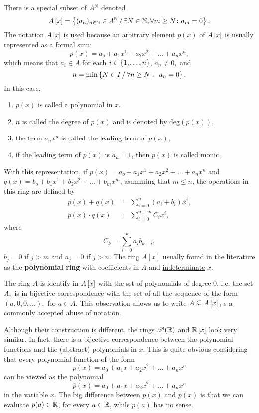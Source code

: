 \documentclass[11pt,a4paper]{article}
\begin{document}
\begin{exa}[Important]
    There is a special subset of $A^{\mathbb{N}}$ denoted
\[
A\left[x\right]=\left\lbrace (a_n)_{n\in \mathbb{N}} \in A^{\mathbb{N}} \,/\, \exists N\in \mathbb{N},\forall m\geq N\colon a_m=0 \right\rbrace,
\]
The notation  $A\left[x\right]$ is used because an arbitrary element $p(x)$ of $A\left[x\right]$ is usually represented as a \underline{formal sum}:
\[p(x)=a_o+a_1x^1+a_2x^2+
	\ldots+a_nx^n,\]
which means that $a_i\in A$ for each $i\in\left\lbrace 1,\ldots,n \right\rbrace$, $ a_n\neq 0,$ and 
\[
    n=\min\left\lbrace N\in I \, / \: \forall n\geq N:\: \: a_n = 0 \right\rbrace. 
\]
In this case,
\begin{enumerate}
    \item $p(x)$ is called a \underline{polynomial} in $x$.
    \item $n$ is called the degree of $p(x)$ and is denoted by $\text{deg}(p(x))$, 
    \item the term $a_nx^n$ is called the \underline{leading} term of $p(x)$,
    \item if the leading term of $p(x)$ is $a_n=1$, then $p(x)$ is called \underline{monic.} 
\end{enumerate} 

With this representation, if $p(x)=a_o+a_1x^1+a_2x^2+
	\ldots+a_nx^n$ and $q(x)=b_o+b_1x^1+b_2x^2+
	\ldots+b_mx^m$, asumming that $m\leq n$, the operations in this ring are defined by
\begin{align*}
    p(x)+q(x)&=\sum_{i=0}^{n} (a_i+b_i)x^i,\\
    p(x)\cdot q(x)&= \sum_{i=0}^{n+m} C_i x^i,
\end{align*}
where \[C_k=\sum_{i=0}^{k} a_ib_{k-i},\] $b_j=0$ if $j> m$ and $a_j=0$ if $j>n$. The ring $A[x]$ usually found in the literature as the \textbf{polynomial ring} with coefficients in $A$ and \underline{indeterminate} $x$. 
\end{exa}

\begin{rem}
    The ring $A$ is identify in $A\left[x\right]$ with the set of polynomials of degree 0, i.e, the set $A,$ is in bijective correspondence with the set of all the sequence of the form
    \((a,0,0,\ldots),\)
    for $a\in A.$ This observation allows us to write $A\subseteq A\left[x\right],$ s a commonly accepted abuse of notation. 
\end{rem}

\begin{rem}
    Although their construction is different, the rings $\mathscr{P}(\mathbb{R})$ and $\mathbb{R}\left[x\right]$ look very similar. In fact, there is a bijective correspondence between the polynomial functions and the (abstract) polynomials in $x$. 
    This is quite obvious considering that every polynomial function of the form 
    \[p(x)=a_0+a_1x+a_2x^2+\ldots + a_n x^n\]
    can be viewed as the polynomial 
    \[\overline{p}(x)=a_0+a_1x+a_2x^2+\ldots + a_n x^n\]
    in the variable $x$. The big difference between $p(x)$ and $\overline{p}(x)$ is that we can evaluate $p(a)\in\mathbb{R}$, for every $a\in\mathbb{R}$, while $\overline{p}(a)$ has no sense.
\end{rem}
\end{document}

